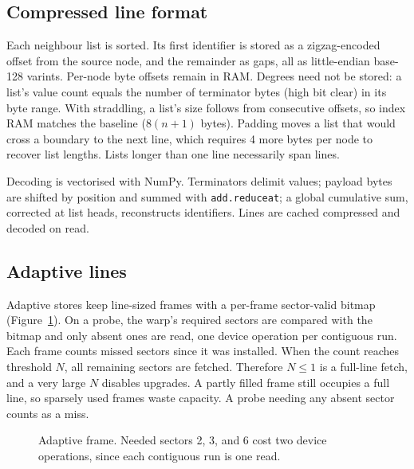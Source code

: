 \documentclass[sigconf,nonacm]{acmart}
\begin{document}
\subsection{Compressed line format}
Each neighbour list is sorted. Its first identifier is stored as a zigzag-encoded offset from the source node, and the remainder as gaps, all as
little-endian base-128 varints. Per-node byte offsets remain in RAM. Degrees need not be stored: a list's value count equals the number of
terminator bytes (high bit clear) in its byte range. With straddling, a list's size follows from consecutive offsets, so index RAM matches
the baseline ($8(n+1)$ bytes). Padding moves a list that would cross a boundary to the next line, which requires 4 more bytes per node to recover
list lengths. Lists longer than one line necessarily span lines.

Decoding is vectorised with NumPy. Terminators delimit values; payload bytes are shifted by position and summed with
\texttt{add.reduceat}; a global cumulative sum, corrected at list heads, reconstructs identifiers. Lines are cached compressed and decoded on read.

\subsection{Adaptive lines}
Adaptive stores keep line-sized frames with a per-frame sector-valid bitmap (Figure~\ref{fig:adaptive}). On a probe, the warp's required sectors are compared with
the bitmap and only absent ones are read, one device operation per contiguous run. Each frame counts missed sectors since it was installed. When the count
reaches threshold $N$, all remaining sectors are fetched. Therefore $N\le 1$ is a full-line fetch, and a very large $N$ disables upgrades. A partly filled frame still
occupies a full line, so sparsely used frames waste capacity. A probe needing any absent sector counts as a miss.

\begin{figure}[t]
\centering
{}
\caption{Adaptive frame. Needed sectors 2, 3, and 6 cost two device operations, since each contiguous run is one read.}\label{fig:adaptive}
\end{figure}
\end{document}

